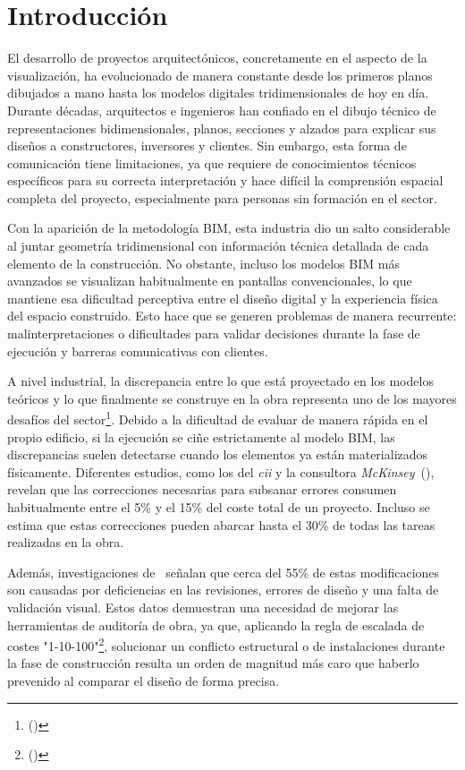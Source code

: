 \chapter{Introducción}
    El desarrollo de proyectos arquitectónicos, concretamente en el aspecto de la visualización, ha evolucionado de manera constante desde los primeros planos dibujados a mano hasta los modelos digitales tridimensionales de hoy en día. Durante décadas, arquitectos e ingenieros han confiado en el dibujo técnico de representaciones bidimensionales, planos, secciones y alzados para explicar sus diseños a constructores, inversores y clientes. Sin embargo, esta forma de comunicación tiene limitaciones, ya que requiere de conocimientos técnicos específicos para su correcta interpretación y hace difícil la comprensión espacial completa del proyecto, especialmente para personas sin formación en el sector.

    Con la aparición de la metodología BIM, esta industria dio un salto considerable al juntar geometría tridimensional con información técnica detallada de cada elemento de la construcción. No obstante, incluso los modelos BIM más avanzados se visualizan habitualmente en pantallas convencionales, lo que mantiene esa dificultad perceptiva entre el diseño digital y la experiencia física del espacio construido. Esto hace que se generen problemas de manera recurrente: malinterpretaciones o dificultades para validar decisiones durante la fase de ejecución y barreras comunicativas con clientes.

    A nivel industrial, la discrepancia entre lo que está proyectado en los modelos teóricos y lo que finalmente se construye en la obra representa uno de los mayores desafíos del sector\footnote{(\cite{cii2001rework})}. Debido a la dificultad de evaluar de manera rápida en el propio edificio, si la ejecución se ciñe estrictamente al modelo BIM, las discrepancias suelen detectarse cuando los elementos ya están materializados físicamente. Diferentes estudios, como los del \textit{\gls{cii}} y la consultora \textit{McKinsey}~(\cite{mckinsey2017reinventing}), revelan que las correcciones necesarias para subsanar errores consumen habitualmente entre el 5\% y el 15\% del coste total de un proyecto. Incluso se estima que estas correcciones pueden abarcar hasta el 30\% de todas las tareas realizadas en la obra. 
    
    Además, investigaciones de~\cite{coaa2005design} señalan que cerca del 55\% de estas modificaciones son causadas por deficiencias en las revisiones, errores de diseño y una falta de validación visual. Estos datos demuestran una necesidad de mejorar las herramientas de auditoría de obra, ya que, aplicando la regla de escalada de costes "1-10-100"\footnote{(\cite{labovitz1992making})}, solucionar un conflicto estructural o de instalaciones durante la fase de construcción resulta un orden de magnitud más caro que haberlo prevenido al comparar el diseño de forma precisa.

